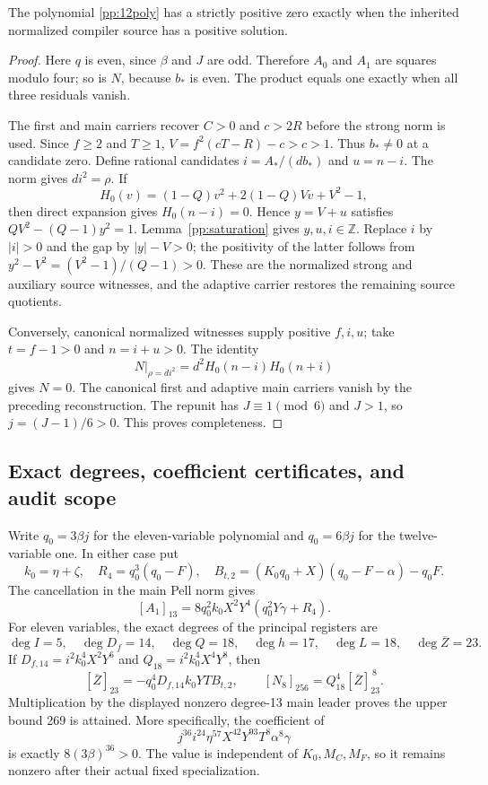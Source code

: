\begin{theorem}
The polynomial \eqref{pp:12poly} has a strictly positive zero exactly when
the inherited normalized compiler source has a positive solution.
\end{theorem}
\begin{proof}
Here $q$ is even, since $\beta$ and $J$ are odd. Therefore $A_0$ and
$A_1$ are squares modulo four; so is $N$, because $b_*$ is even.
The product equals one exactly when all three residuals vanish.

The first and main carriers recover $C>0$ and $c>2R$ before the strong
norm is used. Since $f\ge2$ and $T\ge1$,
$V=f^2(cT-R)-c>c>1$. Thus $b_*\ne0$ at a candidate zero.
Define rational candidates $i=A_* /(db_*)$ and $u=n-i$. The norm gives
$di^2=\rho$. If
\[
 H_0(v)=(1-Q)v^2+2(1-Q)Vv+V^2-1,
\]
then direct expansion gives $H_0(n-i)=0$. Hence $y=V+u$ satisfies
$QV^2-(Q-1)y^2=1$. Lemma~\ref{pp:saturation} gives $y,u,i\in\mathbb Z$.
Replace $i$ by $|i|>0$ and the gap by $|y|-V>0$; the positivity of
the latter follows from $y^2-V^2=(V^2-1)/(Q-1)>0$.
These are the normalized strong and auxiliary source witnesses, and the
adaptive carrier restores the remaining source quotients.

Conversely, canonical normalized witnesses supply positive $f,i,u$;
take $t=f-1>0$ and $n=i+u>0$. The identity
\[
 \left.N\right|_{\rho=di^2}
   =d^2 H_0(n-i)H_0(n+i)
\]
gives $N=0$. The canonical first and adaptive main carriers vanish by
the preceding reconstruction. The repunit has $J\equiv1\pmod6$ and
$J>1$, so $j=(J-1)/6>0$. This proves completeness.
\end{proof}

\subsection{Exact degrees, coefficient certificates, and audit scope}

Write $q_0=3\beta j$ for the eleven-variable polynomial and $q_0=6\beta j$
for the twelve-variable one. In either case put
\[
 k_0=\eta+\zeta,\quad R_4=q_0^3(q_0-F),\quad
 B_{t,2}=(K_0q_0+X)(q_0-F-\alpha)-q_0F.
\]
The cancellation in the main Pell norm gives
\[
 [A_1]_{13}=8q_0^2k_0X^2Y^4(q_0^2Y\gamma+R_4).
\]
For eleven variables, the exact degrees of the principal registers are
\[
 \deg I=5,\quad \deg D_f=14,\quad \deg Q=18,\quad
 \deg h=17,\quad \deg L=18,\quad \deg\overline Z=23.
\]
If $D_{f,14}=i^2k_0^4X^2Y^6$ and $Q_{18}=i^2k_0^4X^4Y^8$, then
\[
 [\overline Z]_{23}=-q_0^4D_{f,14}k_0YT B_{t,2},\qquad
 [N_8]_{256}=Q_{18}^4[\overline Z]_{23}^{\,8}.
\]
Multiplication by the displayed nonzero degree-13 main leader proves
the upper bound 269 is attained. More specifically, the coefficient of
\[
 j^{36}i^{24}\eta^{57}X^{42}Y^{93}T^8\alpha^8\gamma
\]
is exactly $8(3\beta)^{36}>0$. The value is independent of $K_0,M_C,M_F$,
so it remains nonzero after their actual fixed specialization.

